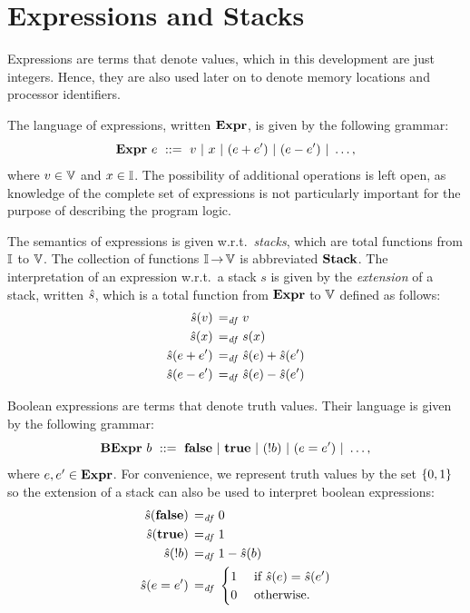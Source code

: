 \documentclass[11pt]{report}
\begin{document}
\section{Expressions and Stacks}
\label{sec:expressions}

Expressions are terms that denote values, which in this development are just integers. Hence, they are also used later on to denote memory locations and processor identifiers. 

The language of expressions, written $\mathbf{Expr}$, is given by the following grammar: \[ \mathbf{Expr}~e ~::=~ v ~|~ x ~|~ (e + e') ~|~ (e - e') ~|~ \ldots, \] where $v \in \mathbb{V}$ and $x \in \mathbb{I}$. The possibility of additional operations is left open, as knowledge of the complete set of expressions is not particularly important for the purpose of describing the program logic.

The semantics of expressions is given w.r.t.~\emph{stacks}, which are total functions from $\mathbb{I}$ to $\mathbb{V}$. The collection of functions $\mathbb{I} \operatorname{\rightarrow} \mathbb{V}$ is abbreviated $\mathbf{Stack}$. The interpretation of an expression w.r.t.~a stack $s$ is given by the \emph{extension} of a stack, written $\hat{s}$, which is a total function from $\mathbf{Expr}$ to $\mathbb{V}$ defined as follows: \begin{align*}
    \hat{s}(v) \operatorname{\;=_{\mathit{df}}\;} & v \\
    \hat{s}(x) \operatorname{\;=_{\mathit{df}}\;} & s(x) \\
    \hat{s}(e + e') \operatorname{\;=_{\mathit{df}}\;} & \hat{s}(e) + \hat{s}(e') \\
    \hat{s}(e - e') \operatorname{\;=_{\mathit{df}}\;} & \hat{s}(e) - \hat{s}(e')
\end{align*}  

Boolean expressions are terms that denote truth values. Their language is given by the following grammar: \[ \mathbf{BExpr}~b ~::=~ \mathbf{false} ~|~ \mathbf{true} ~|~ (!b) ~|~ (e = e') ~|~ \ldots, \] where $e,e' \in \mathbf{Expr}$. For convenience, we represent truth values by the set $\left\lbrace 0,1 \right\rbrace$ so the extension of a stack can also be used to interpret boolean expressions: \begin{align*}
    \hat{s}(\mathbf{false}) \operatorname{\;=_{\mathit{df}}\;} & 0 \\
    \hat{s}(\mathbf{true}) \operatorname{\;=_{\mathit{df}}\;} & 1 \\
    \hat{s}(!b) \operatorname{\;=_{\mathit{df}}\;} & 1 - \hat{s}(b) \\
    \hat{s}(e = e') \operatorname{\;=_{\mathit{df}}\;} & \begin{cases}
        1 &\text{ if } \hat{s}(e) = \hat{s}(e')\\
        0 &\text{ otherwise.}
    \end{cases}
\end{align*}
\end{document}
